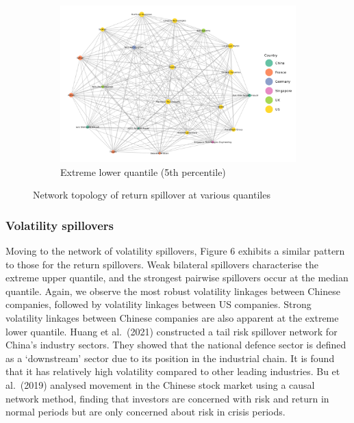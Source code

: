 \documentclass[
  letterpaper,
  DIV=11,
  numbers=noendperiod]{scrartcl}
\begin{document}
\begin{figure}
{\begin{figure}[H]
\end{figure}

\begin{figure}[H]

{\centering \includegraphics[width=6.75in,height=\textheight]{plots/fig-rtn5.png}

}

\caption{Extreme lower quantile (5th percentile)}

\end{figure}

}

\caption{\label{fig-rtn}Network topology of return spillover at various
quantiles}

\end{figure}

\hypertarget{volatility-spillovers}{%
\subsubsection{Volatility spillovers}\label{volatility-spillovers}}

Moving to the network of volatility spillovers, Figure 6 exhibits a
similar pattern to those for the return spillovers. Weak bilateral
spillovers characterise the extreme upper quantile, and the strongest
pairwise spillovers occur at the median quantile. Again, we observe the
most robust volatility linkages between Chinese companies, followed by
volatility linkages between US companies. Strong volatility linkages
between Chinese companies are also apparent at the extreme lower
quantile. Huang et al.~(2021) constructed a tail risk spillover network
for China's industry sectors. They showed that the national defence
sector is defined as a `downstream' sector due to its position in the
industrial chain. It is found that it has relatively high volatility
compared to other leading industries. Bu et al.~(2019) analysed movement
in the Chinese stock market using a causal network method, finding that
investors are concerned with risk and return in normal periods but are
only concerned about risk in crisis periods.
\end{document}
